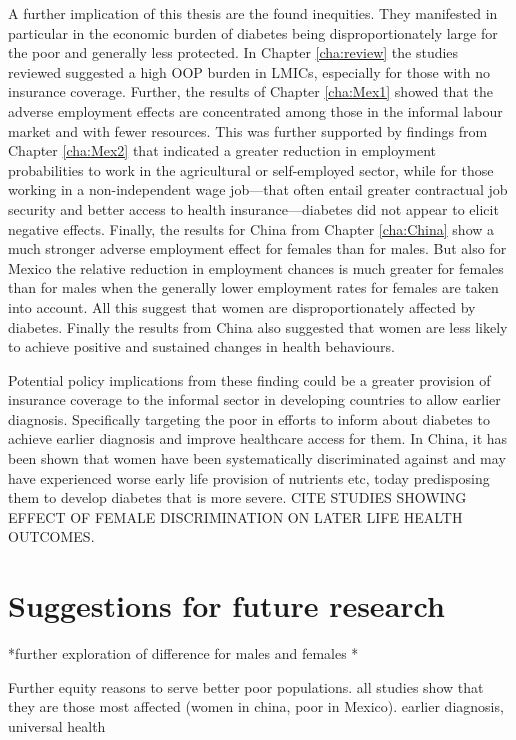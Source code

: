 A further implication of this thesis are the found inequities. They manifested in particular in the economic burden of diabetes being disproportionately large for the poor and generally less protected. In Chapter \ref{cha:review} the studies reviewed suggested a high \ac{OOP} burden in \acp{LMIC}, especially for those with no insurance coverage. Further, the results of Chapter \ref{cha:Mex1} showed that the adverse employment effects are concentrated among those in the informal labour market and with fewer resources. This was further supported by findings from Chapter \ref{cha:Mex2} that indicated a greater reduction in employment probabilities to work in the agricultural or self-employed sector, while for those working in a non-independent wage job---that often entail greater contractual job security and better access to health insurance---diabetes did not appear to elicit negative effects. Finally, the results for China from Chapter \ref{cha:China} show a much stronger adverse employment effect for females than for males. But also for Mexico the relative reduction in employment chances is much greater for females than for males when the generally lower employment rates for females are taken into account. All this suggest that women are disproportionately affected by diabetes. Finally the results from China also suggested that women are less likely to achieve positive and sustained changes in health behaviours.

Potential policy implications from these finding could be a greater provision of insurance coverage to the informal sector in developing countries to allow earlier diagnosis. Specifically targeting the poor in efforts to inform about diabetes to achieve earlier diagnosis and improve healthcare access for them. In China, it has been shown that women have been systematically discriminated against and may have experienced worse early life provision of nutrients etc, today predisposing them to develop diabetes that is more severe. CITE STUDIES SHOWING EFFECT OF FEMALE DISCRIMINATION ON LATER LIFE HEALTH OUTCOMES. 

\section{Suggestions for future research}

*further exploration of difference for males and females
*




 Further  equity reasons to serve better poor populations. all studies show that they are those most affected (women in china, poor in Mexico). earlier diagnosis, universal health 









